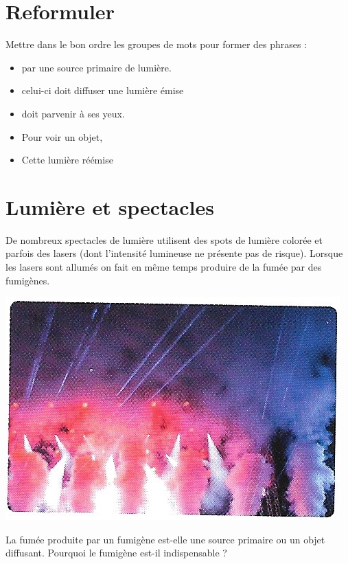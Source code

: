 \documentclass[a4paper,11pt]{exam}
\begin{document}
\section{Reformuler}

Mettre dans le bon ordre les groupes de mots pour former des phrases :
\begin{multicols}{2}
	\begin{itemize}
		\item par une source primaire de lumière.
		\item celui-ci doit diffuser une lumière émise
		\item doit parvenir à ses yeux.
		\item Pour voir un objet,
		\item Cette lumière réémise
	\end{itemize}
\end{multicols}

\section{Lumière et spectacles}

De nombreux spectacles de lumière utilisent des spots de lumière colorée et parfois des lasers (dont l'intensité lumineuse ne présente pas de risque). Lorsque les lasers sont allumés on fait en même temps produire de la fumée par des fumigènes.
\begin{multicols}{2}
	\includegraphics[scale=0.4]{fumees}
	
	\begin{questions}
		\question La fumée produite par un fumigène est-elle une source primaire ou un objet diffusant.
		\question Pourquoi le fumigène est-il indispensable ?
	\end{questions}
	
\end{multicols}
\end{document}
